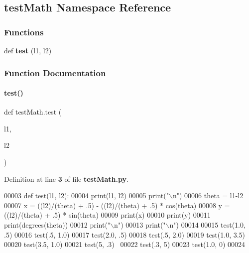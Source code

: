 \subsection{test\+Math Namespace Reference}
\label{a00158}
\subsubsection*{Functions}
\begin{DoxyCompactItemize}
\item 
def \textbf{ test} (l1, l2)
\end{DoxyCompactItemize}


\subsubsection{Function Documentation}
\mbox{\label{a00158_aa1a3d4e1c4f74f13640e69f5e9e1ce39}} 
\paragraph{test()}
{\footnotesize\ttfamily def test\+Math.\+test (\begin{DoxyParamCaption}\item[{}]{l1,  }\item[{}]{l2 }\end{DoxyParamCaption})}



Definition at line \textbf{ 3} of file \textbf{ test\+Math.\+py}.


\begin{DoxyCode}
00003 \textcolor{keyword}{def }test(l1, l2):
00004     print(l1, l2)
00005     print(\textcolor{stringliteral}{"\(\backslash\)n"})
00006     theta = l1-l2
00007     x = ((l2)/(theta) + .5) - ((l2)/(theta) + .5) * cos(theta)
00008     y = ((l2)/(theta) + .5) * sin(theta)
00009     print(x)
00010     print(y)
00011     print(degrees(theta))
00012     print(\textcolor{stringliteral}{"\(\backslash\)n"})
00013     print(\textcolor{stringliteral}{"\(\backslash\)n"})
00014 
00015 test(1.0, .5)
00016 test(.5, 1.0)
00017 test(2.0, .5)
00018 test(.5, 2.0)
00019 test(1.0, 3.5)
00020 test(3.5, 1.0)
00021 test(5, .3) 
00022 test(.3, 5)
00023 test(1.0, 0)
00024 \end{DoxyCode}
